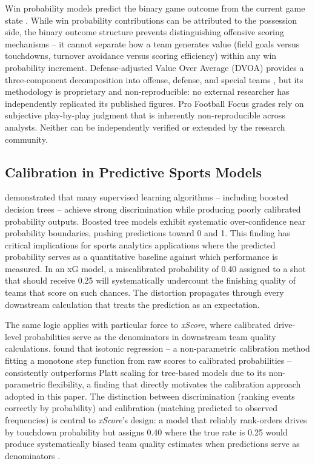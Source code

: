 \documentclass[12pt,a4paper]{article}
\newcommand{\xscore}{\textit{xScore}}
\begin{document}
Win probability models predict the binary game outcome from the current game state \citep{stern1991probability, lock2014randomforests}. While win probability contributions can be attributed to the possession side, the binary outcome structure prevents distinguishing offensive scoring mechanisms -- it cannot separate how a team generates value (field goals versus touchdowns, turnover avoidance versus scoring efficiency) within any win probability increment. Defense-adjusted Value Over Average (DVOA) provides a three-component decomposition into offense, defense, and special teams \citep{schatz2005dvoa}, but its methodology is proprietary and non-reproducible: no external researcher has independently replicated its published figures. Pro Football Focus grades rely on subjective play-by-play judgment that is inherently non-reproducible across analysts. Neither can be independently verified or extended by the research community.

\subsection{Calibration in Predictive Sports Models}

\citet{niculescumizil2005probabilities} demonstrated that many supervised learning algorithms -- including boosted decision trees -- achieve strong discrimination while producing poorly calibrated probability outputs. Boosted tree models exhibit systematic over-confidence near probability boundaries, pushing predictions toward 0 and 1. This finding has critical implications for sports analytics applications where the predicted probability serves as a quantitative baseline against which performance is measured. In an xG model, a miscalibrated probability of 0.40 assigned to a shot that should receive 0.25 will systematically undercount the finishing quality of teams that score on such chances. The distortion propagates through every downstream calculation that treats the prediction as an expectation.

The same logic applies with particular force to \xscore{}, where calibrated drive-level probabilities serve as the denominators in downstream team quality calculations. \citet{niculescumizil2005probabilities} found that isotonic regression -- a non-parametric calibration method fitting a monotone step function from raw scores to calibrated probabilities -- consistently outperforms Platt scaling for tree-based models due to its non-parametric flexibility, a finding that directly motivates the calibration approach adopted in this paper. The distinction between discrimination (ranking events correctly by probability) and calibration (matching predicted to observed frequencies) is central to \xscore{}'s design: a model that reliably rank-orders drives by touchdown probability but assigns 0.40 where the true rate is 0.25 would produce systematically biased team quality estimates when predictions serve as denominators \citep{zadrozny2002transforming}.
\end{document}
